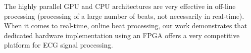 \documentclass[runningheads]{llncs}
\begin{document}
The highly parallel GPU and CPU architectures are very effective in off-line processing
(processing of a large number of beats, not necessarily in real-time).  When it comes to real-time,
online beat processing, our work demonstrates that dedicated hardware implementation
using an FPGA offers a very competitive platform for ECG signal processing.

 


\end{document}
